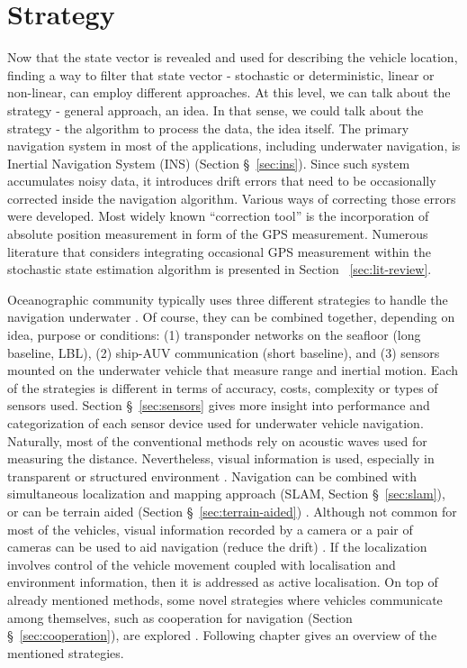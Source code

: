 \section{Strategy} 
Now that the state vector is revealed and used for describing the vehicle location, finding a way to filter that state vector - stochastic or deterministic, linear or non-linear, can employ different approaches. At this level, we can talk about the strategy - general approach, an idea. In that sense, we could talk about the strategy - the algorithm to process the data, the idea itself. The primary navigation system in most of the applications, including underwater navigation, is Inertial Navigation System (INS) (Section \S~\ref{sec:ins}). Since such system accumulates noisy data, it introduces drift errors that need to be occasionally corrected inside the navigation algorithm. Various ways of correcting those errors were developed. Most widely known ``correction tool'' is the incorporation of absolute position measurement in form of the GPS measurement. Numerous literature that considers integrating occasional GPS measurement within the stochastic state estimation algorithm is presented in Section ~\ref{sec:lit-review}. 

Oceanographic community typically uses three different strategies to handle the navigation underwater \cite{whitcomb99}. Of course, they can be combined together, depending on idea, purpose or conditions: (1) transponder networks on the seafloor (long baseline, LBL), (2) ship-AUV communication (short baseline), and (3) sensors mounted on the underwater vehicle that measure range and inertial motion. Each of the strategies is different in terms of accuracy, costs, complexity \cite{eustice05} or types of sensors used. Section \S~\ref{sec:sensors} gives more insight into performance and categorization of each sensor device used for underwater vehicle navigation. Naturally, most of the conventional methods rely on acoustic waves used for measuring the distance. Nevertheless, visual information is used, especially in transparent or structured environment \cite{carreras03}. Navigation can be combined with simultaneous localization and mapping approach (SLAM, Section \S~\ref{sec:slam}), or can be terrain aided (Section \S~\ref{sec:terrain-aided}) \cite{kinsey06}. Although not common for most of the vehicles, visual information recorded by a camera or a pair of cameras can be used to aid navigation (reduce the drift) \cite{eustice05large, bahr08}. If the localization involves control of the vehicle movement coupled with localisation and environment information, then it is addressed as active localisation. On top of already mentioned methods, some novel strategies where vehicles communicate among themselves, such as cooperation for navigation (Section \S~\ref{sec:cooperation}), are explored \cite{bahr08}. Following chapter gives an overview of the mentioned strategies.       

